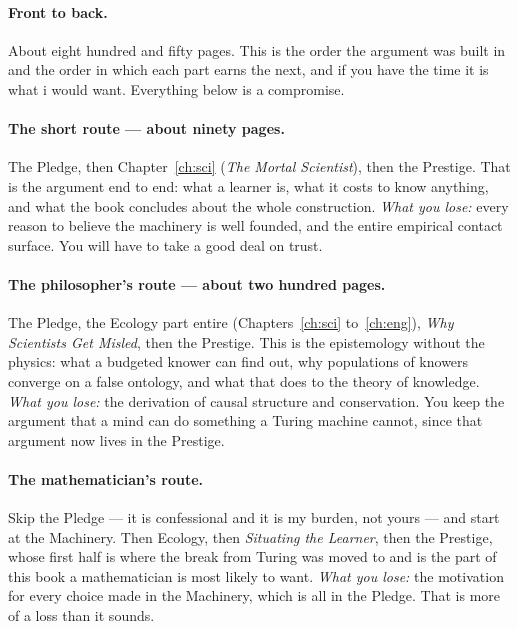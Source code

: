 \paragraph{Front to back.}
About eight hundred and fifty pages.
This is the order the argument was built in and the order in which
each part earns the next, and if you have the time it is what i
would want.
Everything below is a compromise.

\paragraph{The short route --- about ninety pages.}
The Pledge, then Chapter~\ref{ch:sci} (\emph{The Mortal
Scientist}), then the Prestige.
That is the argument end to end: what a learner is, what it costs
to know anything, and what the book concludes about the whole
construction.
\emph{What you lose:} every reason to believe the machinery is well
founded, and the entire empirical contact surface.
You will have to take a good deal on trust.

\paragraph{The philosopher's route --- about two hundred pages.}
The Pledge, the Ecology part entire (Chapters~\ref{ch:sci}
to~\ref{ch:eng}), \emph{Why Scientists Get Misled}, then the
Prestige.
This is the epistemology without the physics: what a budgeted
knower can find out, why populations of knowers converge on a false
ontology, and what that does to the theory of knowledge.
\emph{What you lose:} the derivation of causal structure and
conservation.
You keep the argument that a mind can do something a Turing machine
cannot, since that argument now lives in the Prestige.

\paragraph{The mathematician's route.}
Skip the Pledge --- it is confessional and it is my burden, not
yours --- and start at the Machinery.
Then Ecology, then \emph{Situating the Learner}, then the Prestige,
whose first half is where the break from Turing was moved to and is the
part of this book a mathematician is most likely to want.
\emph{What you lose:} the motivation for every choice made in the
Machinery, which is all in the Pledge.
That is more of a loss than it sounds.

